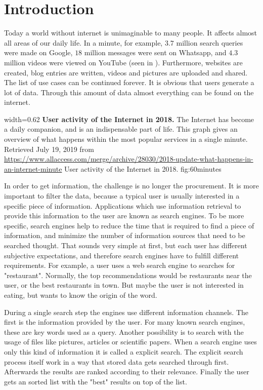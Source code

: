 \chapter{Introduction}
\label{cha:introduction}

Today a world without internet is unimaginable to many people. It affects almost all areas of our daily life. In a minute, for example, $3.7$ million search queries were made on Google, $18$ million messages were sent on Whatsapp, and $4.3$ million videos were viewed on YouTube (seen in ). Furthermore, websites are created, blog entries are written, videos and pictures are uploaded and shared. The list of use cases can be continued forever. It is obvious that users generate a lot of data. Through this amount of data almost everything can be found on the internet.

      {width=0.62\textwidth}
      {\textbf{User activity of the Internet in 2018.} The Internet has become a daily companion, and is an indispensable part of life. This graph gives an overview of what happens within the most popular services in a single minute. Retrieved July 19, 2019 from \url{https://www.allaccess.com/merge/archive/28030/2018-update-what-happens-in-an-internet-minute}}
      {User activity of the Internet in 2018.}
      {fig:60minutes}

In order to get information, the challenge is no longer the procurement. It is more important to filter the data, because a typical user is usually interested in a specific piece of information. Applications which use information retrieval to provide this information to the user are known as search engines. To be more specific, search engines help to reduce the time that is required to find a piece of information, and minimize the number of information sources that need to be searched thought. That sounds very simple at first, but each user has different subjective expectations, and therefore search engines have to fulfill different requirements. For example, a user uses a web search engine to searches for "restaurant". Normally, the top recommendations would be restaurants near the user, or the best restaurants in town. But maybe the user is not interested in eating, but wants to know the origin of the word.

During a single search step the engines use different information channels. The first is the information provided by the user. For many known search engines, these are key words used as a query. Another possibility is to search with the usage of files like pictures, articles or scientific papers. When a search engine uses only this kind of information it is called a explicit search. The explicit search process itself work in a way that stored data gets searched through first. Afterwards the results are ranked according to their relevance. Finally the user gets an sorted list with the "best" results on top of the list.

